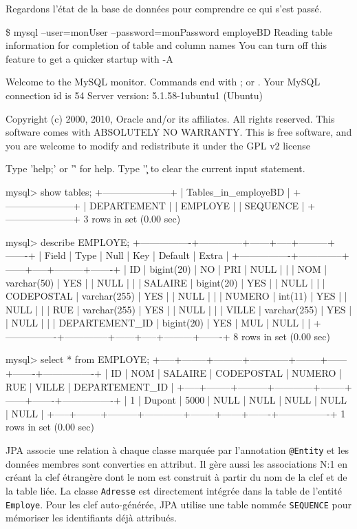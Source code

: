 \documentclass[a4paper,11pt]{article}
\begin{document}
Regardons l'état de la base de données pour comprendre ce qui s'est passé.
\begin{code_shell}
\$ mysql --user=monUser --password=monPassword employeBD
Reading table information for completion of table and column names
You can turn off this feature to get a quicker startup with -A

Welcome to the MySQL monitor.  Commands end with ; or \g.
Your MySQL connection id is 54
Server version: 5.1.58-1ubuntu1 (Ubuntu)

Copyright (c) 2000, 2010, Oracle and/or its affiliates. All rights reserved.
This software comes with ABSOLUTELY NO WARRANTY. This is free software,
and you are welcome to modify and redistribute it under the GPL v2 license

Type 'help;' or '\h' for help. Type '\c' to clear the current input statement.

mysql> show tables;
+---------------------+
| Tables_in_employeBD |
+---------------------+
| DEPARTEMENT         |
| EMPLOYE             |
| SEQUENCE            |
+---------------------+
3 rows in set (0.00 sec)

mysql> describe EMPLOYE;
+----------------+--------------+------+-----+---------+-------+
| Field          | Type         | Null | Key | Default | Extra |
+----------------+--------------+------+-----+---------+-------+
| ID             | bigint(20)   | NO   | PRI | NULL    |       |
| NOM            | varchar(50)  | YES  |     | NULL    |       |
| SALAIRE        | bigint(20)   | YES  |     | NULL    |       |
| CODEPOSTAL     | varchar(255) | YES  |     | NULL    |       |
| NUMERO         | int(11)      | YES  |     | NULL    |       |
| RUE            | varchar(255) | YES  |     | NULL    |       |
| VILLE          | varchar(255) | YES  |     | NULL    |       |
| DEPARTEMENT_ID | bigint(20)   | YES  | MUL | NULL    |       |
+----------------+--------------+------+-----+---------+-------+
8 rows in set (0.00 sec)

mysql> select * from EMPLOYE;
+-----+--------+---------+------------+--------+------+-------+----------------+
| ID  | NOM    | SALAIRE | CODEPOSTAL | NUMERO | RUE  | VILLE | DEPARTEMENT_ID |
+-----+--------+---------+------------+--------+------+-------+----------------+
|   1 | Dupont |    5000 | NULL       |   NULL | NULL | NULL  |           NULL |
+-----+--------+---------+------------+--------+------+-------+----------------+
1 rows in set (0.00 sec)
\end{code_shell}
JPA associe une relation à chaque classe marquée par l'annotation \texttt{@Entity} et les données membres sont converties 
en attribut. Il gère aussi les associations N:1 en créant la clef étrangère dont le nom est construit à partir du nom de 
la clef et de la table liée. La classe \texttt{Adresse} est directement intégrée dans la table de l'entité \texttt{Employe}.
Pour les clef auto-générée, JPA utilise une table nommée \texttt{SEQUENCE} pour mémoriser les identifiants déjà attribués.
\end{document}
